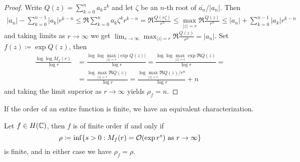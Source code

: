 \begin{proof}
    Write $Q(z) = \sum_{k=0}^n a_k z^k$ and let $\zeta$ be an $n$-th root of $\overline{a_n} / \vert a_n \vert$. Then
    \begin{align*}
        \vert a_n \vert - \sum_{k=0}^{n-1} \vert a_k \vert r^{k-n} \leq \Re \sum_{k=0}^{n} a_k \zeta^k r^{k-n} = \Re \frac{Q(r \zeta)}{r^n} \leq \max_{\vert z \vert = r} \Re \frac{Q(z)}{r^n} \leq \vert a_n \vert + \sum_{k=0}^{n-1} \vert a_k \vert r^{k-n}
    \end{align*}
    and taking limits as $r \to \infty$ we get $\lim_{r \to \infty} \max_{\vert z \vert = r} \Re \frac{Q(z)}{r^n} = \vert a_n \vert$. Set $f(z) \coloneqq \exp Q(z)$, then
    \begin{align*}
        \frac{\log \log M_f(r)}{\log r} &= \frac{\log \log \max_{\vert z \vert = r} \vert \exp Q(z) \vert}{\log r} = \frac{\log \log \max_{\vert z \vert = r} \exp \Re Q(z)}{\log r} = \\
        &= \frac{\log \max_{\vert z \vert = r} \Re Q(z)}{\log r} = \frac{\log \max_{\vert z \vert = r} \Re Q(z) / r^n}{\log r} + n
    \end{align*}
    and taking the limit superior as $r \to \infty$ yields $\rho_f = n$.
\end{proof}


If the order of an entire function is finite, we have an equivalent characterization.

\begin{proposition} \label{prop:order-infimum}
    Let $f \in H(\mathbb{C})$, then $f$ is of finite order if and only if
    \begin{equation}
        \rho \coloneqq \inf \{ s > 0 : M_f(r) = \mathcal{O}(\exp r^s) \textrm{ as } r \to \infty \}
    \end{equation}
    is finite, and in either case we have $\rho_f = \rho$.
\end{proposition}

